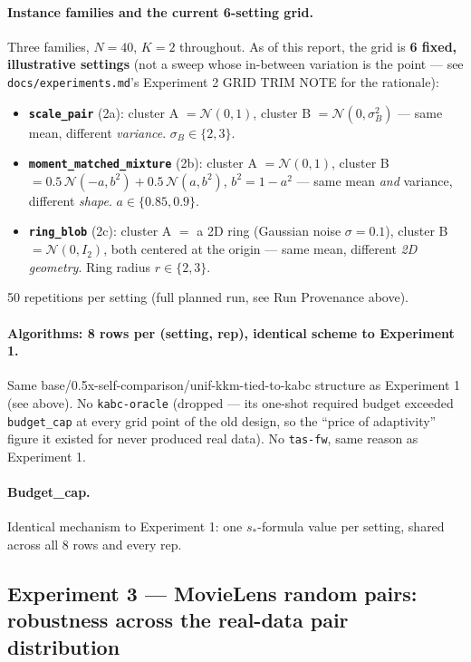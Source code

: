 \documentclass[11pt]{article}
\begin{document}
\paragraph{Instance families and the current 6-setting grid.} Three
families, $N=40$, $K=2$ throughout. As of this report, the grid is
\textbf{6 fixed, illustrative settings} (not a sweep whose in-between
variation is the point --- see \texttt{docs/experiments.md}'s Experiment 2
GRID TRIM NOTE for the rationale):
\begin{itemize}
  \item \textbf{\texttt{scale\_pair}} (2a): cluster A $=\mathcal N(0,1)$, cluster B
    $=\mathcal N(0,\sigma_B^2)$ --- same mean, different \emph{variance}.
    $\sigma_B \in \{2, 3\}$.
  \item \textbf{\texttt{moment\_matched\_mixture}} (2b): cluster A $=\mathcal
    N(0,1)$, cluster B $= 0.5\,\mathcal N(-a,b^2) + 0.5\,\mathcal N(a,b^2)$,
    $b^2=1-a^2$ --- same mean \emph{and} variance, different \emph{shape}.
    $a \in \{0.85, 0.9\}$.
  \item \textbf{\texttt{ring\_blob}} (2c): cluster A $=$ a 2D ring (Gaussian
    noise $\sigma=0.1$), cluster B $=\mathcal N(0,I_2)$, both centered at the
    origin --- same mean, different \emph{2D geometry}. Ring radius $r \in
    \{2, 3\}$.
\end{itemize}
50 repetitions per setting (full planned run, see Run Provenance above).

\paragraph{Algorithms: 8 rows per (setting, rep), identical scheme to
Experiment 1.} Same base/0.5x-self-comparison/unif-kkm-tied-to-kabc
structure as Experiment 1 (see above). No \texttt{kabc-oracle} (dropped ---
its one-shot required budget exceeded \texttt{budget\_cap} at every grid
point of the old design, so the ``price of adaptivity'' figure it existed
for never produced real data). No \texttt{tas-fw}, same reason as
Experiment 1.

\paragraph{Budget\_cap.} Identical mechanism to Experiment 1: one
$s_*$-formula value per setting, shared across all 8 rows and every rep.

\subsection{Experiment 3 --- MovieLens random pairs: robustness across the real-data pair distribution}
\end{document}
